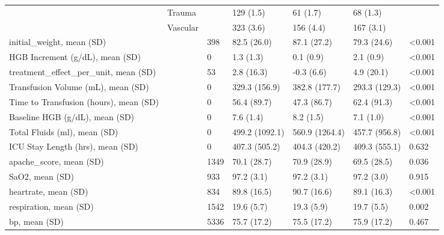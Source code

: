 \begin{tabular}{lllllll}
{{{{{{{{ & Trauma &  & 129 (1.5) & 61 (1.7) & 68 (1.3) &  \\
 & Vascular &  & 323 (3.6) & 156 (4.4) & 167 (3.1) &  \\
\cline{1-7}
initial_weight, mean (SD) &  & 398 & 82.5 (26.0) & 87.1 (27.2) & 79.3 (24.6) & <0.001 \\
\cline{1-7}
HGB Increment (g/dL), mean (SD) &  & 0 & 1.3 (1.3) & 0.1 (0.9) & 2.1 (0.9) & <0.001 \\
\cline{1-7}
treatment_effect_per_unit, mean (SD) &  & 53 & 2.8 (16.3) & -0.3 (6.6) & 4.9 (20.1) & <0.001 \\
\cline{1-7}
Transfusion Volume (mL), mean (SD) &  & 0 & 329.3 (156.9) & 382.8 (177.7) & 293.3 (129.3) & <0.001 \\
\cline{1-7}
Time to Transfusion (hours), mean (SD) &  & 0 & 56.4 (89.7) & 47.3 (86.7) & 62.4 (91.3) & <0.001 \\
\cline{1-7}
Baseline HGB (g/dL), mean (SD) &  & 0 & 7.6 (1.4) & 8.2 (1.5) & 7.1 (1.0) & <0.001 \\
\cline{1-7}
Total Fluids (ml), mean (SD) &  & 0 & 499.2 (1092.1) & 560.9 (1264.4) & 457.7 (956.8) & <0.001 \\
\cline{1-7}
ICU Stay Length (hrs), mean (SD) &  & 0 & 407.3 (505.2) & 404.3 (420.2) & 409.3 (555.1) & 0.632 \\
\cline{1-7}
apache_score, mean (SD) &  & 1349 & 70.1 (28.7) & 70.9 (28.9) & 69.5 (28.5) & 0.036 \\
\cline{1-7}
SaO2, mean (SD) &  & 933 & 97.2 (3.1) & 97.2 (3.1) & 97.2 (3.0) & 0.915 \\
\cline{1-7}
heartrate, mean (SD) &  & 834 & 89.8 (16.5) & 90.7 (16.6) & 89.1 (16.3) & <0.001 \\
\cline{1-7}
respiration, mean (SD) &  & 1542 & 19.6 (5.7) & 19.3 (5.9) & 19.7 (5.5) & 0.002 \\
\cline{1-7}
bp, mean (SD) &  & 5336 & 75.7 (17.2) & 75.5 (17.2) & 75.9 (17.2) & 0.467 \\
\cline{1-7}
\bottomrule
\end{tabular}
